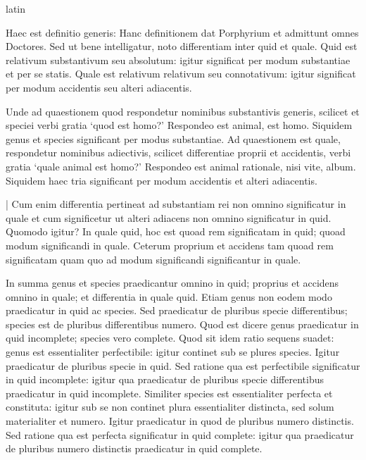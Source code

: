 \begin{otherlanguage*}{latin}
        \pstart
        \pend
      
\pstart
  Haec est definitio generis:  Hanc definitionem dat Porphyrium et admittunt omnes Doctores. Sed ut bene intelligatur, noto differentiam inter quid et quale. Quid est relativum substantivum seu absolutum: igitur significat per modum substantiae et per se statis. Quale est relativum relativum seu connotativum: igitur significat per modum accidentis seu alteri adiacentis. 
\pend

\pstart
  Unde ad quaestionem quod respondetur nominibus substantivis generis, scilicet et speciei verbi gratia `quod est homo?' Respondeo est animal, est homo. Siquidem genus et species significant per modus substantiae. Ad quaestionem est quale, respondetur nominibus adiectivis, scilicet differentiae proprii et accidentis, verbi gratia `quale animal est homo?' Respondeo est animal rationale, nisi vite, album. Siquidem haec tria significant per modum accidentis et alteri adiacentis. 
\pend

\pstart
  \textnormal{|} Cum enim differentia pertineat ad substantiam rei non omnino significatur in quale et cum significetur ut alteri adiacens non omnino significatur in quid. Quomodo igitur? In quale quid, hoc est quoad rem significatam in quid; quoad modum significandi in quale. Ceterum proprium et accidens tam quoad rem significatam quam quo ad modum significandi significantur in quale. 
\pend

\pstart
  In summa genus et species praedicantur omnino in quid; proprius et accidens omnino in quale; et differentia in quale quid. Etiam genus non eodem modo praedicatur in quid ac species. Sed praedicatur de pluribus specie differentibus; species est de pluribus differentibus numero. Quod est dicere genus praedicatur in quid incomplete; species vero complete. Quod sit idem ratio sequens suadet: genus est essentialiter perfectibile: igitur continet sub se plures species. Igitur praedicatur de pluribus specie in quid. Sed ratione qua est perfectibile significatur in quid incomplete: igitur qua praedicatur de pluribus specie differentibus praedicatur in quid incomplete. Similiter species est essentialiter perfecta et constituta: igitur sub se non continet plura essentialiter distincta, sed solum materialiter et numero. Igitur praedicatur in quod de pluribus numero distinctis. Sed ratione qua est perfecta significatur in quid complete: igitur qua praedicatur de pluribus numero distinctis praedicatur in quid complete. 
\pend


\end{otherlanguage*}
